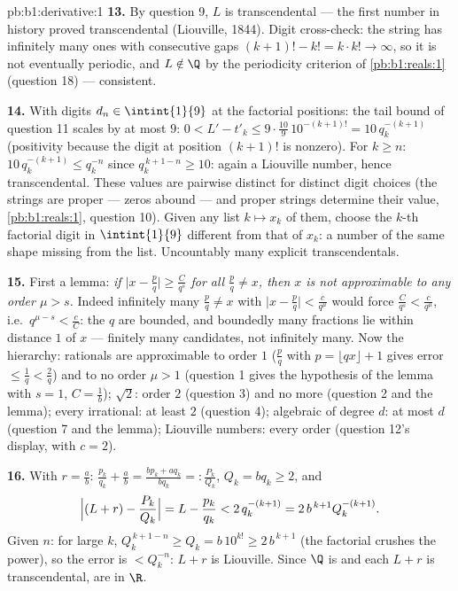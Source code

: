 \begin{solution}{pb:b1:derivative:1}
\textbf{13.} By question 9, $L$ is transcendental --- the first
number in history proved transcendental (Liouville, 1844).
Digit cross-check: the string has infinitely many ones with
consecutive gaps $(k+1)! - k! = k\cdot k! \to \infty$, so it is
not eventually periodic, and $L \notin \Q$ by the periodicity
criterion of \cref{pb:b1:reals:1} (question 18) --- consistent.

\textbf{14.} With digits $d_n \in \intint{1}{9}$ at the
factorial positions: the tail bound of question 11 scales by at
most $9$: $0 < L' - t'_k \leq 9\cdot\frac{10}{9}\,10^{-(k+1)!} =
10\,q_k^{-(k+1)}$ (positivity because the digit at position
$(k+1)!$ is nonzero). For $k \geq n$: $10\,q_k^{-(k+1)} \leq
q_k^{-n}$ since $q_k^{\,k+1-n} \geq 10$: again a Liouville
number, hence transcendental. These values are pairwise
distinct for distinct digit choices (the strings are proper ---
zeros abound --- and proper strings determine their value,
\cref{pb:b1:reals:1}, question 10). Given any list $k \mapsto
x_k$ of them, choose the $k$-th factorial digit in
$\intint{1}{9}$ different from that of $x_k$: a number of the
same shape missing from the list. Uncountably many explicit
transcendentals.

\textbf{15.} First a lemma: \emph{if $\bigl|x - \frac pq\bigr|
\geq \frac{C}{q^s}$ for all $\frac pq \neq x$, then $x$ is not
approximable to any order $\mu > s$.} Indeed infinitely many
$\frac pq \neq x$ with $\bigl|x - \frac pq\bigr| <
\frac{c}{q^\mu}$ would force $\frac{C}{q^s} < \frac{c}{q^\mu}$,
i.e.\ $q^{\mu - s} < \frac cC$: the $q$ are bounded, and
boundedly many fractions lie within distance $1$ of $x$ ---
finitely many candidates, not infinitely many. Now the
hierarchy: rationals are approximable to order $1$ ($\frac
pq$ with $p = \lfloor qx\rfloor + 1$ gives error $\leq \frac1q <
\frac2q$) and to no order $\mu > 1$ (question 1 gives the
hypothesis of the lemma with $s = 1$, $C = \frac1b$); $\sqrt2$:
order $2$ (question 3) and no more (question 2 and the lemma);
every irrational: at least $2$ (question 4); algebraic of degree
$d$: at most $d$ (question 7 and the lemma); Liouville numbers:
every order (question 12's display, with $c = 2$).

\textbf{16.} With $r = \frac ab$: $\frac{p_k}{q_k} + \frac ab =
\frac{b p_k + a q_k}{b q_k} =: \frac{P_k}{Q_k}$, $Q_k = b q_k
\geq 2$, and
\[
\Bigl|(L + r) - \frac{P_k}{Q_k}\Bigr| = L - \frac{p_k}{q_k}
< 2\,q_k^{-(k+1)} = 2\,b^{\,k+1} Q_k^{-(k+1)} .
\]
Given $n$: for large $k$, $Q_k^{\,k+1-n} \geq Q_k = b\,10^{k!}
\geq 2\,b^{\,k+1}$ (the factorial crushes the power), so the
error is $< Q_k^{-n}$: $L + r$ is Liouville. Since $\Q$ is 
and each $L + r$ is transcendental,  are
 in $\R$.


\end{solution}
